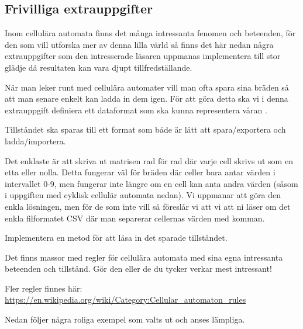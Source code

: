\subsection{Frivilliga extrauppgifter}

Inom cellulära automata finns det många intressanta fenomen och beteenden, för den som vill utforska mer av denna lilla värld så finns det här nedan några extrauppgifter som den intresserade läsaren uppmanas implementera till stor glädje då resultaten kan vara djupt tillfredställande.



	När man leker runt med cellulära automater vill man ofta spara sina bräden så att man senare enkelt kan ladda in dem igen. För att göra detta ska vi i denna extrauppgift definiera ett dataformat som ska kunna representera våran .

        Tillståndet ska sparas till ett format som både är lätt att spara/exportera och ladda/importera.
        
        Det enklaste är att skriva ut matrisen rad för rad där varje cell skrivs ut som en etta eller nolla. Detta fungerar väl för bräden där celler bara antar värden i intervallet 0-9, men fungerar inte längre om en cell kan anta andra värden (såsom i uppgiften med cyklisk cellulär automata nedan). 
        Vi uppmanar att göra den enkla lösningen, men för de som inte vill så föreslår vi att vi att ni läser om det enkla filformatet CSV där man separerar cellernas värden med komman.
        
        Implementera en metod för att läsa in det sparade tillståndet.


    Det finns massor med regler för cellulära automata med sina egna intressanta beteenden och tillstånd.
    Gör den eller de du tycker verkar mest intressant!

    Fler regler finnes här: \url{https://en.wikipedia.org/wiki/Category:Cellular_automaton_rules}

    Nedan följer några roliga exempel som valts ut och anses lämpliga.


